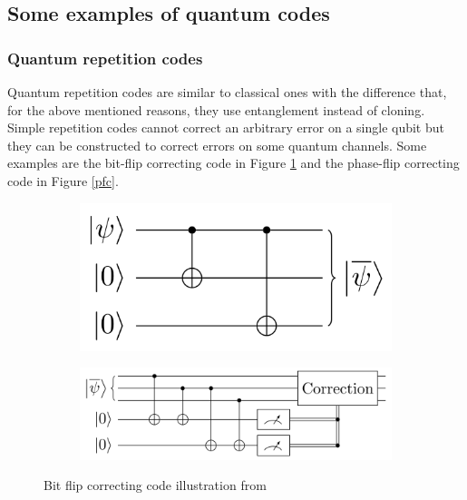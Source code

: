 \documentclass{article}
\begin{document}
\subsection{Some examples of quantum codes}

\subsubsection{Quantum repetition codes}

Quantum repetition codes are similar to classical ones with the difference that, for the
above mentioned reasons, they use entanglement instead of cloning.
Simple repetition codes cannot correct an arbitrary error on a single qubit but they can
be constructed to correct errors on some quantum channels.
Some examples are the bit-flip correcting code in Figure \ref{bfc}
and the phase-flip correcting code in Figure \ref{pfc}.

\begin{figure}[H]

	\begin{subfigure}{0.5\textwidth}
		\includegraphics[scale = 0.23]{bit-flip-encode.png}
	\end{subfigure}
	\hspace{-60pt}
	\begin{subfigure}{0.5\textwidth}
		\includegraphics[scale = 0.23]{bit-flip-detect.png}
	\end{subfigure}

	\caption{Bit flip correcting code illustration from \cite{prefetch_repetition_code}}\label{bfc}
\end{figure}
\end{document}
